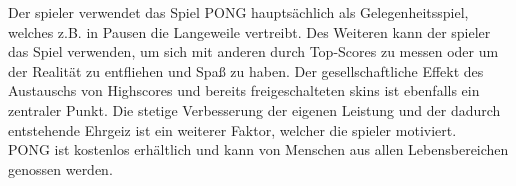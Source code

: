 Der \gls{spieler} verwendet das Spiel PONG hauptsächlich als Gelegenheitsspiel, welches z.B. in Pausen die Langeweile vertreibt. 
Des Weiteren kann der \gls{spieler} das Spiel verwenden, um sich mit anderen durch Top-Scores zu messen oder um der Realität zu entfliehen und Spaß zu haben. 
Der gesellschaftliche Effekt des Austauschs von Highscores und bereits freigeschalteten \glspl{skin} ist ebenfalls ein zentraler Punkt. Die stetige Verbesserung der eigenen Leistung und der dadurch entstehende Ehrgeiz ist ein weiterer Faktor, welcher die \gls{spieler} motiviert.
\\
PONG ist kostenlos erhältlich und kann von Menschen aus allen Lebens\-bereichen genossen werden.

